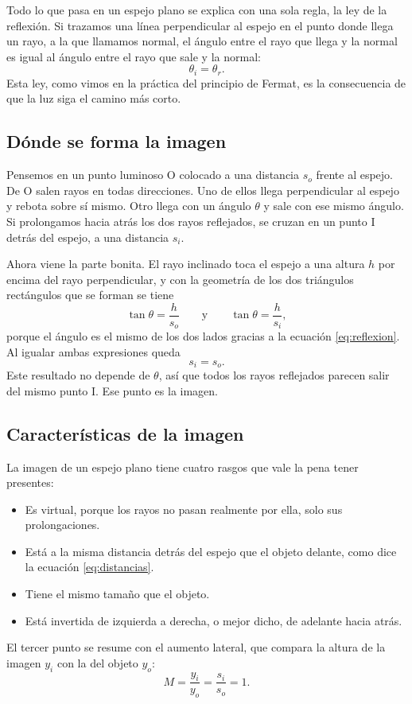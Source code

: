 Todo lo que pasa en un espejo plano se explica con una sola regla, la ley de la reflexión. Si trazamos una línea perpendicular al espejo en el punto donde llega un rayo, a la que llamamos normal, el ángulo entre el rayo que llega y la normal es igual al ángulo entre el rayo que sale y la normal:
\begin{equation}
\theta_i = \theta_r .
\label{eq:reflexion}
\end{equation}
Esta ley, como vimos en la práctica del principio de Fermat, es la consecuencia de que la luz siga el camino más corto.

\subsection{Dónde se forma la imagen}
Pensemos en un punto luminoso O colocado a una distancia $s_o$ frente al espejo. De O salen rayos en todas direcciones. Uno de ellos llega perpendicular al espejo y rebota sobre sí mismo. Otro llega con un ángulo $\theta$ y sale con ese mismo ángulo. Si prolongamos hacia atrás los dos rayos reflejados, se cruzan en un punto I detrás del espejo, a una distancia $s_i$.

Ahora viene la parte bonita. El rayo inclinado toca el espejo a una altura $h$ por encima del rayo perpendicular, y con la geometría de los dos triángulos rectángulos que se forman se tiene
\begin{equation}
\tan\theta = \frac{h}{s_o} \qquad \text{y} \qquad \tan\theta = \frac{h}{s_i} ,
\label{eq:tangentes}
\end{equation}
porque el ángulo es el mismo de los dos lados gracias a la ecuación \eqref{eq:reflexion}. Al igualar ambas expresiones queda
\begin{equation}
s_i = s_o .
\label{eq:distancias}
\end{equation}
Este resultado no depende de $\theta$, así que todos los rayos reflejados parecen salir del mismo punto I. Ese punto es la imagen.

\subsection{Características de la imagen}
La imagen de un espejo plano tiene cuatro rasgos que vale la pena tener presentes:
\begin{itemize}
\item Es virtual, porque los rayos no pasan realmente por ella, solo sus prolongaciones.
\item Está a la misma distancia detrás del espejo que el objeto delante, como dice la ecuación \eqref{eq:distancias}.
\item Tiene el mismo tamaño que el objeto.
\item Está invertida de izquierda a derecha, o mejor dicho, de adelante hacia atrás.
\end{itemize}
El tercer punto se resume con el aumento lateral, que compara la altura de la imagen $y_i$ con la del objeto $y_o$:
\begin{equation}
M = \frac{y_i}{y_o} = \frac{s_i}{s_o} = 1 .
\label{eq:aumento}
\end{equation}

